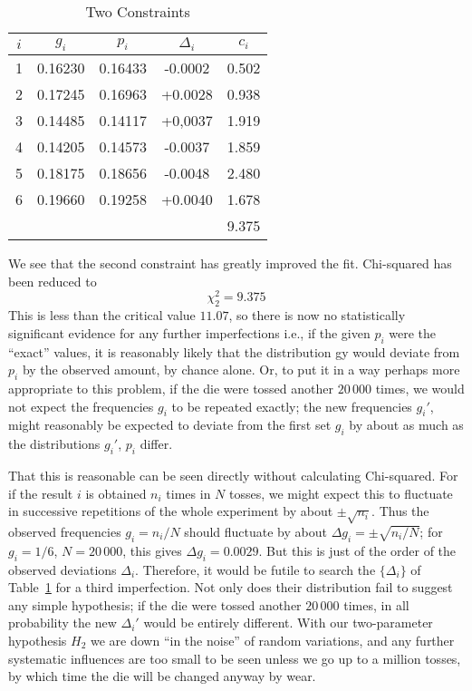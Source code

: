 {\begin{table}[htbp]
	\centering
	{
	\lfstyle
	\begin{tabular}{c c c c c}
		\toprule
		$i$ & $g_i$ & $p_i$ & $\Delta_i$ & $c_i$\\
		\midrule
		1 & 0.16230 & 0.16433 & -0.0002 & 0.502\\
		2 & 0.17245 & 0.16963 & +0.0028 & 0.938\\
		3 & 0.14485 & 0.14117 & +0,0037 & 1.919\\
		4 & 0.14205 & 0.14573 & -0.0037 & 1.859\\
		5 & 0.18175 & 0.18656 & -0.0048 & 2.480\\
		6 & 0.19660 & 0.19258 & +0.0040 & 1.678\\
		\cmidrule{5-5}
		  &         &         &         & 9.375\\
		\bottomrule
	\end{tabular}
}
	\caption{Two Constraints}
	\label{tab:2}
\end{table}
We see that the second constraint has greatly improved the fit.
Chi-squared has been reduced to
\begin{equation}
	\label{B67}
	\chi^2_2 = 9.375
\end{equation}
This is less than the critical value $11.07$, so there is now no statistically significant evidence for any further imperfections i.e., if the given $p_i$ were the ``exact'' values, it is reasonably likely that the distribution gy would deviate from $p_i$ by the observed amount, by chance alone.
Or, to put it in a way perhaps more appropriate to this problem, if the die were tossed another $20\,000$ times, we would not expect the frequencies $g_i$ to be repeated exactly; the new frequencies $g_i'$, might reasonably be expected to deviate from the first set $g_i$ by about as much as the distributions $g_i'$, $p_i$ differ.

That this is reasonable can be seen directly without calculating Chi-squared.
For if the result $i$ is obtained $n_i$ times in $N$ tosses, we might expect this to fluctuate in successive
repetitions of the whole experiment by about $\pm\sqrt{n_i}$.
Thus the observed frequencies $g_i = n_i/N$ should fluctuate by about $\Delta g_i = \pm \sqrt{n_i/N}$;
for $g_i = 1/6$, $N = 20\,000$, this gives $\Delta g_i = 0.0029$.
But this is just of the order of the observed deviations $\Delta_i$.
Therefore, it would be futile to search the $\{\Delta_i\}$ of Table~\ref{tab:2} for a third imperfection.
Not only does their distribution fail to suggest any simple hypothesis; if the die were tossed another $20\,000$ times, in all probability the new $\Delta_i'$ would be entirely different.
With our two-parameter hypothesis $H_2$ we are down ``in the noise'' of random variations, and any further systematic influences are too small to be seen unless we go up to a million tosses, by which time the die will be changed anyway by wear.

}

